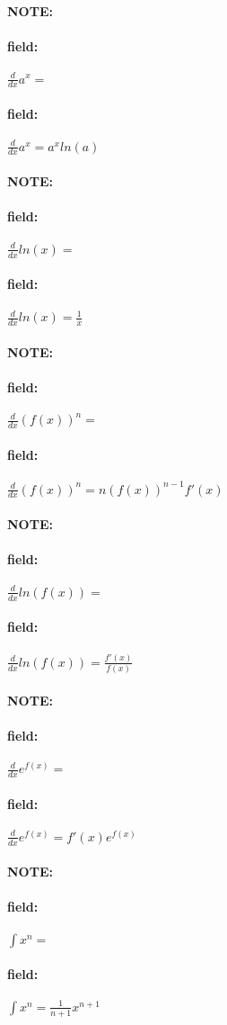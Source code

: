 \documentclass[12pt]{article}
\newenvironment{note}{\paragraph{NOTE:}}{}
\newenvironment{field}{\paragraph{field:}}{}
\begin{document}
\begin{note}
  \begin{field}
    $\frac{d}{dx} a^x = $
  \end{field}
  \begin{field}
    $\frac{d}{dx} a^x = a^x ln(a)$
  \end{field}
\end{note}

\begin{note}
  \begin{field}
    $\frac{d}{dx} ln(x) = $
  \end{field}
  \begin{field}
    $\frac{d}{dx} ln(x) = \frac{1}{x}$
  \end{field}
\end{note}

\begin{note}
  \begin{field}
    $\frac{d}{dx} (f(x))^n = $
  \end{field}
  \begin{field}
    $\frac{d}{dx} (f(x))^n = n(f(x))^{n-1}f'(x)$
  \end{field}
\end{note}

\begin{note}
  \begin{field}
    $ \frac{d}{dx} ln(f(x)) = $
  \end{field}
  \begin{field}
    $ \frac{d}{dx} ln(f(x)) = \frac{f'(x)}{f(x)}$
  \end{field}
\end{note}

\begin{note}
  \begin{field}
    $\frac{d}{dx} e^{f(x)} = $
  \end{field}
  \begin{field}
    $\frac{d}{dx} e^{f(x)} = f'(x)e^{f(x)}$
  \end{field}
\end{note}

\begin{note}
  \begin{field}
    $\int x^n = $
  \end{field}
  \begin{field}
    $\int x^n = \frac{1}{n+1}x^{n+1}$
  \end{field}
\end{note}
\end{document}
